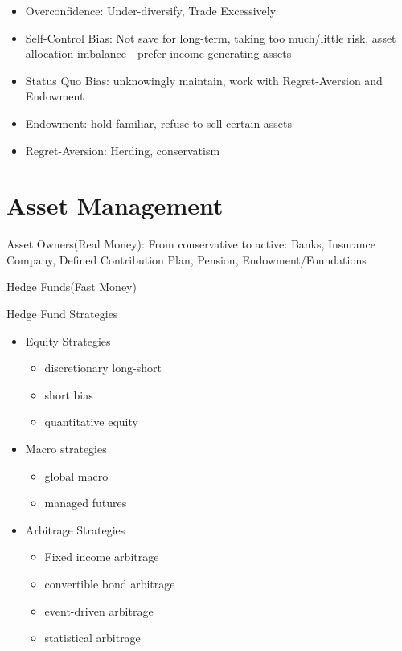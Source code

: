 \documentclass[11pt, openany]{book}              %
\begin{document}
\begin{itemize}
\begin{itemize}
    		\item Overconfidence: Under-diversify, Trade Excessively 
    		\item Self-Control Bias: Not save for long-term, taking too much/little risk, asset allocation imbalance - prefer income generating assets
    		\item Status Quo Bias: unknowingly maintain, work with Regret-Aversion and Endowment
    		\item Endowment: hold familiar, refuse to sell certain assets
    		\item Regret-Aversion: Herding, conservatism
    		\end{itemize}
\end{itemize}


\section{Asset Management}

Asset Owners(Real Money): From conservative to active: Banks, Insurance Company, Defined Contribution Plan, Pension, Endowment/Foundations 

Hedge Funds(Fast Money)

Hedge Fund Strategies 

\begin{itemize}
	\item Equity Strategies
	\begin{itemize}
			\item discretionary long-short
		\item short bias
		\item quantitative equity
	\end{itemize}

	\item Macro strategies
	\begin{itemize}
		\item global macro
		\item managed futures
	\end{itemize}

	\item Arbitrage Strategies
	\begin{itemize}
		\item Fixed income arbitrage
		\item convertible bond arbitrage
		\item event-driven arbitrage
		\item statistical arbitrage
	\end{itemize}
\end{itemize}
\end{document}
